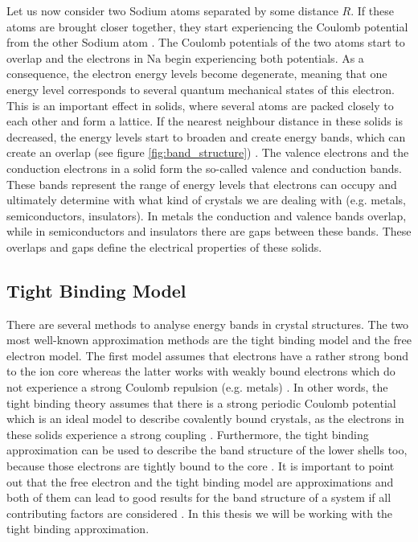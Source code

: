 Let us now consider two Sodium atoms separated by some distance $R$. If these atoms are brought closer together, they start experiencing the Coulomb potential from the other Sodium atom \cite{Quinn2018}. The Coulomb potentials of the two atoms start to overlap and the electrons in $\mathrm{Na}$ begin experiencing both potentials. As a consequence, the electron energy levels become degenerate, meaning that one energy level corresponds to several quantum mechanical states of this electron. This is an important effect in solids, where several atoms are packed closely to each other and form a lattice. If the nearest neighbour distance in these solids is decreased, the energy levels start to broaden and create energy bands, which can create an overlap (see figure \ref{fig:band_structure}) \cite{Quinn2018}. The valence electrons and the conduction electrons in a solid form the so-called valence and conduction bands. These bands represent the range of energy levels that electrons can occupy and ultimately determine with what kind of crystals we are dealing with (e.g. metals, semiconductors, insulators). In metals the conduction and valence bands overlap, while in semiconductors and insulators there are gaps between these bands. These overlaps and gaps define the electrical properties of these solids.


\subsection{Tight Binding Model}\label{tight_binding_method}

There are several methods to analyse energy bands in crystal structures. The two most well-known approximation methods are the tight binding model and the free electron model. The first model assumes that electrons have a rather strong bond to the ion core whereas the latter works with weakly bound electrons which do not experience a strong Coulomb repulsion (e.g. metals) \cite{Quinn2018}. In other words, the tight binding theory assumes that there is a strong periodic Coulomb potential which is an ideal model to describe covalently bound crystals, as the electrons in these solids experience a strong coupling \cite{Girvin2019, Hofmann2015}. Furthermore, the tight binding approximation can be used to describe the band structure of the lower shells too, because those electrons are tightly bound to the core \cite{Patterson2007}. It is important to point out that the free electron and the tight binding model are approximations and both of them can lead to good results for the band structure of a system if all contributing factors are considered \cite{Hofmann2015}. In this thesis we will be working with the tight binding approximation.

